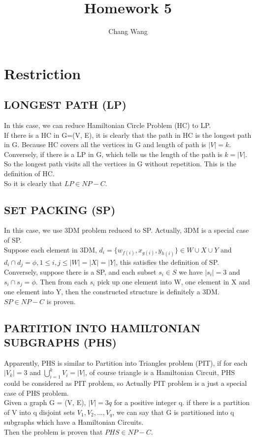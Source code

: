 \documentclass[12pt]{report}
\title{Homework 5}
\author{Chang Wang}
\begin{document}
\maketitle

\section{Restriction}
\subsection{LONGEST PATH (LP)}
In this case, we can reduce Hamiltonian Circle Problem (HC) to LP. \\
If there is a HC in G=(V, E), it is clearly that the path in HC is the longest path in G. Because HC covers all the vertices in G and length of path is $|V|=k$. \\
Conversely, if there is a LP in G, which tells us the length of the path is $k=|V|$. So the longest path visits all the vertices in G without repetition. This is the definition of HC. \\
So it is clearly that $LP \in NP-C$.

\subsection{SET PACKING (SP)}
In this case, we use 3DM problem reduced to SP. Actually, 3DM is a special case of SP.\\
Suppose each element in 3DM, $d_{i} = \{w_{f(i)}, x_{g(i)}, y_{h(i)}\} \in W \cup X \cup Y$ and $d_{i} \cap d_{j} = \phi, 1 \le i, j \le |W|=|X|=|Y|$, this satisfies the definition of SP. \\
Conversely, suppose there is a SP, and each subset $s_{i} \in S$ we have $|s_{i}| = 3$ and $s_{i} \cap s_{j} = \phi$. Then from each $s_{i}$ pick up one element into W, one element in X and one element into Y, then the constructed structure is definitely a 3DM. \\
$SP \in NP-C$ is proven.

\subsection{PARTITION INTO HAMILTONIAN SUBGRAPHS (PHS)}
Apparently, PHS is similar to Partition into Triangles problem (PIT), if for each $|V_{k}| = 3$ and $\bigcup_{i=1}^{k}V_{i} = |V|$, of course triangle is a Hamiltonian Circuit, PHS could be considered as PIT problem, so Actually PIT problem is a just a special case of PHS problem. \\
Given a graph G = (V, E), $|V| = 3q$ for a positive integer q. if there is a partition of V into q disjoint sets $V_{1}, V_{2}, ..., V_{q}$, we can say that G is partitioned into q subgraphs which have a Hamiltonian Circuits. \\
Then the problem is proven that $PHS \in NP-C$.
\end{document}
